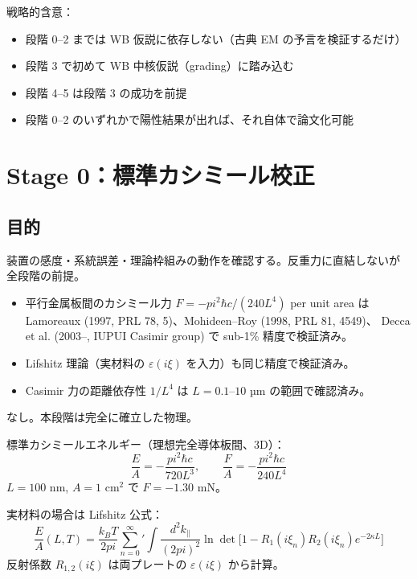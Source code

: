 \documentclass[11pt,a4paper]{article}
\def\pi{pi}%
\def\textbf#1{#1}%
\begin{document}
\textbf{戦略的含意}：
\begin{itemize}
\item 段階 0--2 までは \textbf{WB 仮説に依存しない}（古典 EM の予言を検証するだけ）
\item 段階 3 で初めて WB 中核仮説（grading）に踏み込む
\item 段階 4--5 は段階 3 の成功を前提
\item 段階 0--2 のいずれかで陽性結果が出れば、それ自体で論文化可能
\end{itemize}

\newpage

\section{Stage 0：標準カシミール校正}

\subsection{目的}

装置の感度・系統誤差・理論枠組みの動作を確認する。\textbf{反重力に直結しないが
全段階の前提}。

\begin{confirmedbox}
\begin{itemize}
\item 平行金属板間のカシミール力 $F = -\pi^2 \hbar c / (240 L^4)$ per unit area は
  Lamoreaux (1997, PRL 78, 5)、Mohideen--Roy (1998, PRL 81, 4549)、
  Decca et al. (2003--, IUPUI Casimir group) で sub-1\% 精度で検証済み。
\item Lifshitz 理論（実材料の $\varepsilon(i\xi)$ を入力）も同じ精度で検証済み。
\item Casimir 力の距離依存性 $1/L^4$ は $L = 0.1$--$10$ µm の範囲で確認済み。
\end{itemize}
\end{confirmedbox}

\begin{hypothesisbox}
なし。本段階は完全に確立した物理。
\end{hypothesisbox}

\begin{theorybox}
標準カシミールエネルギー（理想完全導体板間、3D）：
\[
  \frac{E}{A} = -\frac{\pi^2 \hbar c}{720 L^3},\qquad
  \frac{F}{A} = -\frac{\pi^2 \hbar c}{240 L^4}
\]
$L = 100$ nm, $A = 1$ cm$^2$ で $F = -1.30$ mN。

実材料の場合は Lifshitz 公式：
\[
  \frac{E}{A}(L,T) = \frac{k_B T}{2\pi}\sum_{n=0}^\infty{}'\!\int\!\frac{d^2 k_\parallel}{(2\pi)^2}
  \ln\det\!\bigl[1 - R_1(i\xi_n) R_2(i\xi_n) e^{-2\kappa L}\bigr]
\]
反射係数 $R_{1,2}(i\xi) $ は両プレートの $\varepsilon(i\xi)$ から計算。
\end{theorybox}
\end{document}
